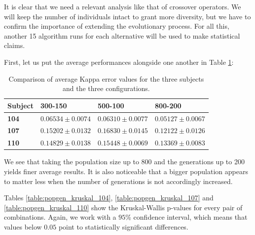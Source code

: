 	It is clear that we need a relevant analysis like that of crossover operators. We will keep the number of individuals intact to grant more diversity, but we have to confirm the importance of extending the evolutionary process. For all this, another 15 algorithm runs for each alternative will be used to make statistical claims.

	First, let us put the average performances alongside one another in Table \ref{table:popgen_kappa}:

	\vspace{0.3cm}

	\begin{table}[h]

        \centering
        \setlength\arrayrulewidth{0.8pt}

        \begin{tabular}{| >{\centering\arraybackslash}m{0.5in} | >{\centering\arraybackslash}m{1.1in} | >{\centering\arraybackslash}m{1.1in} | >{\centering\arraybackslash}m{1.1in} |}

            \hline
            \rowcolor{RoyalBlue}
            \textbf{Subject} & \textbf{300-150} & \textbf{500-100} & \textbf{800-200} \\
            \hline
            \textbf{104} & $0.06534 \pm 0.0074$ & $0.06310 \pm 0.0077$ & $0.05127 \pm 0.0067$ \\
            \hline
            \textbf{107} & $0.15202 \pm 0.0132$ & $0.16830 \pm 0.0145$ & $0.12122 \pm 0.0126$ \\
            \hline
            \textbf{110} & $0.14829 \pm 0.0138$ & $0.15448 \pm 0.0069$ & $0.13369 \pm 0.0083$ \\
            \hline

        \end{tabular}

        \caption{Comparison of average Kappa error values for the three subjects and the three configurations.}\label{table:popgen_kappa}

    \end{table}

    We see that taking the population size up to 800 and the generations up to 200 yields finer average results. It is also noticeable that a bigger population appears to matter less when the number of generations is not accordingly increased.

\newpage

    Tables \ref{table:popgen_kruskal_104}, \ref{table:popgen_kruskal_107} and \ref{table:popgen_kruskal_110} show the Kruskal-Wallis p-values for every pair of combinations. Again, we work with a $95\%$ confidence interval, which means that values below $0.05$ point to statistically significant differences.

